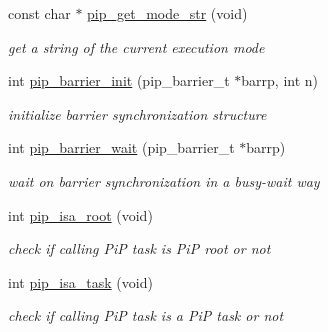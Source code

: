 \begin{DoxyCompactItemize}
\item 
const char $\ast$ \hyperlink{group__libpip_ga0e12c95fe7abc5c356acfd45a89ad5d8}{pip\-\_\-get\-\_\-mode\-\_\-str} (void)
\begin{DoxyCompactList}\small\item\em get a string of the current execution mode \end{DoxyCompactList}\end{DoxyCompactItemize}
\begin{DoxyCompactItemize}
\item 
int \hyperlink{group__libpip_ga84022f9c64f431e7d513342aeed0b61e}{pip\-\_\-barrier\-\_\-init} (pip\-\_\-barrier\-\_\-t $\ast$barrp, int n)
\begin{DoxyCompactList}\small\item\em initialize barrier synchronization structure \end{DoxyCompactList}\end{DoxyCompactItemize}
\begin{DoxyCompactItemize}
\item 
int \hyperlink{group__libpip_gaca103c9732a8e28ee8faf79ef4a69e4f}{pip\-\_\-barrier\-\_\-wait} (pip\-\_\-barrier\-\_\-t $\ast$barrp)
\begin{DoxyCompactList}\small\item\em wait on barrier synchronization in a busy-\/wait way \end{DoxyCompactList}\end{DoxyCompactItemize}
\begin{DoxyCompactItemize}
\item 
int \hyperlink{group__libpip_ga6f1045bdbf682cb2ac504f09b57b73e9}{pip\-\_\-isa\-\_\-root} (void)
\begin{DoxyCompactList}\small\item\em check if calling Pi\-P task is Pi\-P root or not \end{DoxyCompactList}\end{DoxyCompactItemize}
\begin{DoxyCompactItemize}
\item 
int \hyperlink{group__libpip_gaf0283e47ad2d415206d6a3fa61e8a0a9}{pip\-\_\-isa\-\_\-task} (void)
\begin{DoxyCompactList}\small\item\em check if calling Pi\-P task is a Pi\-P task or not \end{DoxyCompactList}\end{DoxyCompactItemize}
